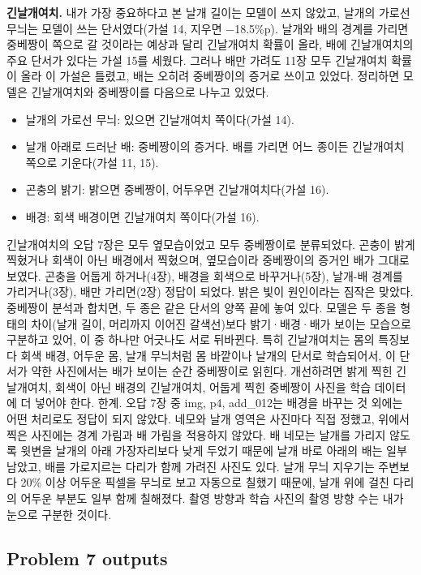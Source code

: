 \documentclass[11pt]{article}
\begin{document}
\textbf{긴날개여치.} 내가 가장 중요하다고 본 날개 길이는 모델이 쓰지 않았고, 날개의 가로선 무늬는 모델이 쓰는 단서였다(가설 14, 지우면 $-$18.5\%p). 날개와 배의 경계를 가리면 중베짱이 쪽으로 갈 것이라는 예상과 달리 긴날개여치 확률이 올라, 배에 긴날개여치의 주요 단서가 있다는 가설 15를 세웠다. 그러나 배만 가려도 11장 모두 긴날개여치 확률이 올라 이 가설은 틀렸고, 배는 오히려 중베짱이의 증거로 쓰이고 있었다. 정리하면 모델은 긴날개여치와 중베짱이를 다음으로 나누고 있었다.
\begin{itemize}
\item 날개의 가로선 무늬: 있으면 긴날개여치 쪽이다(가설 14).
\item 날개 아래로 드러난 배: 중베짱이의 증거다. 배를 가리면 어느 종이든 긴날개여치 쪽으로 기운다(가설 11, 15).
\item 곤충의 밝기: 밝으면 중베짱이, 어두우면 긴날개여치다(가설 16).
\item 배경: 회색 배경이면 긴날개여치 쪽이다(가설 16).
\end{itemize}
긴날개여치의 오답 7장은 모두 옆모습이었고 모두 중베짱이로 분류되었다. 곤충이 밝게 찍혔거나 회색이 아닌 배경에서 찍혔으며, 옆모습이라 중베짱이의 증거인 배가 그대로 보였다. 곤충을 어둡게 하거나(4장), 배경을 회색으로 바꾸거나(5장), 날개-배 경계를 가리거나(3장), 배만 가리면(2장) 정답이 되었다. 밝은 빛이 원인이라는 짐작은 맞았다.
중베짱이 분석과 합치면, 두 종은 같은 단서의 양쪽 끝에 놓여 있다. 모델은 두 종을 형태의 차이(날개 길이, 머리까지 이어진 갈색선)보다 밝기·배경·배가 보이는 모습으로 구분하고 있어, 이 중 하나만 어긋나도 서로 뒤바뀐다. 특히 긴날개여치는 몸의 특징보다 회색 배경, 어두운 몸, 날개 무늬처럼 몸 바깥이나 날개의 단서로 학습되어서, 이 단서가 약한 사진에서는 배가 보이는 순간 중베짱이로 읽힌다. 개선하려면 밝게 찍힌 긴날개여치, 회색이 아닌 배경의 긴날개여치, 어둡게 찍힌 중베짱이 사진을 학습 데이터에 더 넣어야 한다.
한계. 오답 7장 중 img, p4, add\_012는 배경을 바꾸는 것 외에는 어떤 처리로도 정답이 되지 않았다. 네모와 날개 영역은 사진마다 직접 정했고, 위에서 찍은 사진에는 경계 가림과 배 가림을 적용하지 않았다. 배 네모는 날개를 가리지 않도록 윗변을 날개의 아래 가장자리보다 낮게 두었기 때문에 날개 바로 아래의 배는 일부 남았고, 배를 가로지르는 다리가 함께 가려진 사진도 있다. 날개 무늬 지우기는 주변보다 20\% 이상 어두운 픽셀을 무늬로 보고 자동으로 칠했기 때문에, 날개 위에 걸친 다리의 어두운 부분도 일부 함께 칠해졌다. 촬영 방향과 학습 사진의 촬영 방향 수는 내가 눈으로 구분한 것이다.

\subsection*{Problem 7 outputs}
\end{document}
